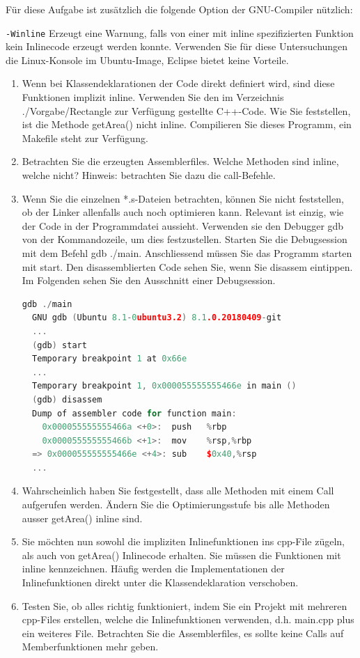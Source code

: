 Für diese Aufgabe ist zusätzlich die folgende Option der GNU-Compiler nützlich:

\texttt{-Winline} Erzeugt eine Warnung, falls von einer mit inline spezifizierten Funktion kein Inlinecode erzeugt werden konnte.
Verwenden Sie für diese Untersuchungen die Linux-Konsole im Ubuntu-Image, Eclipse bietet keine Vorteile.

\begin{enumerate}
  \item Wenn bei Klassendeklarationen der Code direkt definiert wird, sind diese Funktionen implizit inline. Verwenden Sie den im Verzeichnis ./Vorgabe/Rectangle zur Verfügung gestellte C++-Code. Wie Sie feststellen, ist die Methode getArea() nicht inline. Compilieren Sie dieses Programm, ein Makefile steht zur Verfügung.
  \item Betrachten Sie die erzeugten Assemblerfiles. Welche Methoden sind inline, welche nicht? Hinweis: betrachten Sie dazu die call-Befehle.
  \item Wenn Sie die einzelnen *.s-Dateien betrachten, können Sie nicht feststellen, ob der Linker allenfalls auch noch optimieren kann. Relevant ist einzig, wie der Code in der Programmdatei aussieht. Verwenden sie den Debugger gdb von der Kommandozeile, um dies festzustellen. Starten Sie die Debugsession mit dem Befehl gdb ./main. Anschliessend müssen Sie das Programm starten mit start. Den disassemblierten Code sehen Sie, wenn Sie disassem eintippen. Im Folgenden sehen Sie den Ausschnitt einer Debugsession.

\begin{lstlisting}[language=C++, style=C++]
gdb ./main
  GNU gdb (Ubuntu 8.1-0ubuntu3.2) 8.1.0.20180409-git
  ...
  (gdb) start
  Temporary breakpoint 1 at 0x66e
  ...
  Temporary breakpoint 1, 0x000055555555466e in main ()
  (gdb) disassem
  Dump of assembler code for function main:
    0x000055555555466a <+0>:  push   %rbp
    0x000055555555466b <+1>:  mov    %rsp,%rbp
  => 0x000055555555466e <+4>: sub    $0x40,%rsp
  ...
\end{lstlisting}

  \item Wahrscheinlich haben Sie festgestellt, dass alle Methoden mit einem Call aufgerufen werden. Ändern Sie die Optimierungsstufe bis alle Methoden ausser getArea() inline sind.
  \item Sie möchten nun sowohl die impliziten Inlinefunktionen ins cpp-File zügeln, als auch von getArea() Inlinecode erhalten. Sie müssen die Funktionen mit inline kennzeichnen. Häufig werden die Implementationen der Inlinefunktionen direkt unter die Klassendeklaration verschoben.
  \item Testen Sie, ob alles richtig funktioniert, indem Sie ein Projekt mit mehreren cpp-Files erstellen, welche die Inlinefunktionen verwenden, d.h. main.cpp plus ein weiteres File. Betrachten Sie die Assemblerfiles, es sollte keine Calls auf Memberfunktionen mehr geben.
\end{enumerate}

